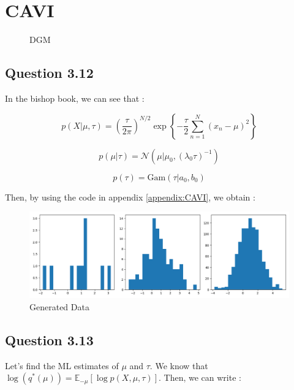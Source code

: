 \documentclass{article}
\begin{document}
\section{CAVI}

\begin{figure}[H]
    \centering
    
    \caption{DGM}
    \label{fig:fig3}
\end{figure}

\subsection{Question 3.12}

In the bishop book, we can see that :

\begin{equation}
    p(X|\mu, \tau) = \left(\frac{\tau}{2\pi}\right)^{N/2} \exp\left\{-\frac{\tau}{2}\sum_{n=1}^{N}(x_n - \mu)^2\right\}
\end{equation}

\begin{equation}
    p(\mu|\tau) = \mathcal{N}(\mu|\mu_0, (\lambda_0 \tau)^{-1})
\end{equation}

\begin{equation}
    p(\tau) = \text{Gam}(\tau|a_0, b_0)
\end{equation}

Then, by using the code in appendix \ref{appendix:CAVI}, we obtain :

\begin{figure}[H]
    \centering
    \includegraphics[scale=0.5]{images/12_data.png}
    \caption{Generated Data}
    \label{fig:3.12}
\end{figure}

\subsection{Question 3.13}

Let's find the ML estimates of $\mu$ and $\tau$.
We know that $\log(q^*(\mu)) = \mathbb{E}_{-\mu}[\log p(X, \mu, \tau)]$.
Then, we can write :
\end{document}
